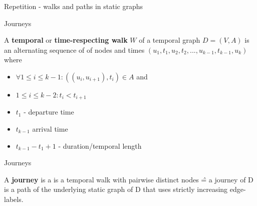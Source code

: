 \documentclass{beamer}
\begin{document}
\begin{frame}{Repetition - walks and paths in static graphs}
  \begin{itemize}
  \end{itemize}
\end{frame}


\begin{frame}{Journeys}
	\begin{tcolorbox}[definitionstyle, title=Definition: temporal/time respecting walk]
		A \textbf{temporal} or \textbf{time-respecting walk} $W$ of a temporal graph $D = (V, A)$ is an alternating sequence of of nodes and times $(u_1 , t_1 , u_2 , t_2 , ... , u_{k-1} , t_{k-1} , u_k )$
		where 
		\begin{itemize}
			\item $\forall 1 \leq i \leq k - 1: ((u_i , u_{i+1} ), t_i ) \in A$ and
			\item $1 \leq i \leq k - 2: t_i < t_{i + 1}$
		\end{itemize}
	\end{tcolorbox}
	\begin{itemize}
		\item $t_1$ - departure time
		\item $t_{k - 1}$ arrival time
		\item $t_{k - 1} - t_1 + 1$ - duration/temporal length
	\end{itemize}
\end{frame}

\begin{frame}{Journeys}
	\begin{tcolorbox}[definitionstyle, title=Definition: Journey]
		A \textbf{journey} is a is a temporal walk with pairwise distinct nodes \^{=} a journey of D is a path of the underlying static graph of D that uses
strictly increasing edge-labels.
	\end{tcolorbox}

\end{frame}
\end{document}
